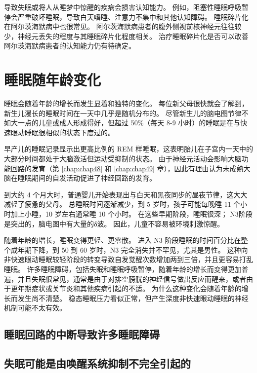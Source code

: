 导致失眠或将人从睡梦中惊醒的疾病会损害认知能力。
例如，阻塞性睡眠呼吸暂停会严重破坏睡眠，导致白天嗜睡、注意力不集中和其他认知障碍。
睡眠碎片化在阿尔茨海默病中也很常见。
阿尔茨海默病患者的腹外侧视前核神经元往往较少，神经元丢失的程度与其睡眠碎片化程度相关。
治疗睡眠碎片化是否可以改善阿尔茨海默病患者的认知能力仍有待确定。



\section{睡眠随年龄变化}

睡眠会随着年龄的增长而发生显着和独特的变化。
每位新父母很快就会了解到，新生儿漫长的睡眠时间在一天中几乎是随机分布的。
尽管新生儿的脑电图节律不如大一点的儿童或成人形成得好，但超过 50\%（每天 8-9 小时）的睡眠是在与快速眼动睡眠很相似的状态下度过的。


早产儿的睡眠记录显示出更高比例的 REM 样睡眠，这表明胎儿在子宫内一天中的大部分时间都处于大脑激活但运动受抑制的状态。
由于神经元活动会影响大脑功能回路的发育（第 \ref{chap:chap48} 和 \ref{chap:chap49} 章），因此有理由认为未成熟大脑在睡眠期间的自发活动促进了神经回路的发育。


到大约 4 个月大时，普通婴儿开始表现出与白天和黑夜同步的昼夜节律，这大大减轻了疲惫的父母。
总睡眠时间逐渐减少，到 5 岁时，孩子可能每晚睡 11 个小时加上小睡，10 岁左右通常睡 10 个小时。
在这些早期阶段，睡眠很深；
N3阶段是突出的，脑电图中有大量的δ波。
因此，儿童不容易被环境刺激惊醒。


随着年龄的增长，睡眠变得更轻、更零散。
进入 N3 阶段睡眠的时间百分比在整个成年期下降，到 50 到 60 岁时，N3 完全消失并不罕见，尤其是男性。
这种向非快速眼动睡眠较轻阶段的转变导致自发觉醒次数增加两到三倍，并且更容易打乱睡眠。
许多睡眠障碍，包括失眠和睡眠呼吸暂停，随着年龄的增长而变得更加普遍，并且失眠很常见，通常是由于对排空膀胱的神经信号做出反应而醒来，或者由于更年期症状或关节炎和其他疾病引起的不适。
为什么这种变化会随着年龄的增长而发生尚不清楚。
稳态睡眠压力看似正常，但产生深度非快速眼动睡眠的神经机制可能不太有效。



\subsection{睡眠回路的中断导致许多睡眠障碍}

\subsection{失眠可能是由唤醒系统抑制不完全引起的}

